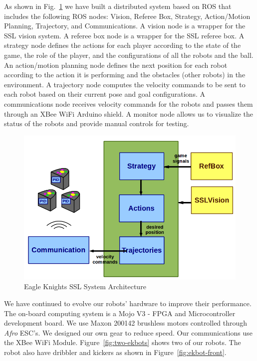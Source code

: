 \documentclass[]{llncs}
\newcommand{\TODO}[1]{{\textcolor{blue}{ToDo: {#1}}}}
\begin{document}
As shown in Fig.~\ref{fig:eagle-knights-architecture} we have built a distributed system based on ROS that includes the following ROS nodes: Vision, Referee Box, Strategy, Action/Motion Planning, Trajectory, and Communications. A vision node is a wrapper for the SSL vision system. A referee box node is a wrapper for the SSL referee box. A strategy node defines the actions for each player according to the state of the game, the role of the player, and the configurations of all the robots and the ball. An action/motion planning node defines the next position for each robot according to the action it is performing and the obstacles (other robots) in the environment. A trajectory node computes the velocity commands to be sent to each robot based on their current pose and goal configurations. A communications node receives velocity commands for the robots and passes them through an XBee WiFi Arduino shield. A monitor node allows us to visualize the status of the robots and provide manual controls for testing.

\begin{figure}[htb]
	\centering
	\includegraphics[width=12cm]{./pictures/eagle_knights_architecture.png}
	\caption{Eagle Knights SSL System Architecture}
	\label{fig:eagle-knights-architecture}  
\end{figure}



We have continued to evolve our robots' hardware to improve their performance. The on-board computing system is a Mojo V3 - FPGA and Microcontroller development board. We use Maxon 200142 brushless motors controlled through \textit{Afro} ESC's. We designed our own gear to reduce speed. Our communications use the XBee WiFi Module. Figure~\ref{fig:two-ekbots} shows two of our robots. The robot also have dribbler and kickers as shown in Figure~\ref{fig:ekbot-front}.
\end{document}
